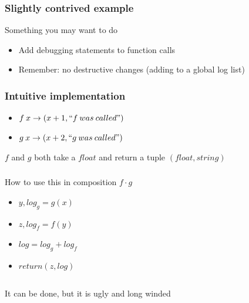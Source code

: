\begin{frame}
    \frametitle{Slightly contrived example}
    \begin{block}{Something you may want to do}
        \begin{itemize}
            \item Add debugging statements to function calls
            \item Remember: no destructive changes (adding to a global log list)
        \end{itemize}
    \end{block}
\end{frame}

\begin{frame}[fragile]
    \frametitle{Intuitive implementation}
    \begin{block}{}
        \begin{itemize}
            \item $f \: x \rightarrow (x+1, ``f \: was \: called")$
            \item $g \: x \rightarrow (x+2, ``g \: was \: called")$
        \end{itemize}
    \end{block}
    \begin{block}{}
        $f$ and $g$ both take a $float$ and return a tuple $(float, string)$
    \end{block}
\end{frame}

\begin{frame}[fragile]
    \frametitle{}
    \begin{block}{How to use this in composition $f \cdot g$}
        \begin{itemize}
            \item $y, log_g = g(x)$
            \item $z, log_f = f(y)$
            \item $log = log_g + log_f$
            \item $return (z, log)$
        \end{itemize}
\begin{lstlisting}
\end{lstlisting}
    \end{block}
    \begin{block}{}
        It can be done, but it is ugly and long winded
    \end{block}
\end{frame}

